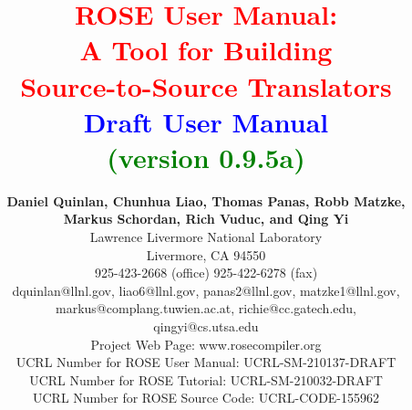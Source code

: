 \documentclass[10pt]{book}
\begin{document}
\title{ {\bf \textcolor{red}{         ROSE User Manual: \\ 
                                     A Tool for Building \\
                                Source-to-Source Translators} \\
                             \textcolor{blue}{Draft User Manual} \\
                               \textcolor{green}{(version 0.9.5a)} } }

\author{ {\bf Daniel Quinlan, Chunhua Liao, Thomas Panas, Robb Matzke,} \\
         {\bf Markus Schordan, Rich Vuduc, and Qing Yi} \\
         Lawrence Livermore National Laboratory \\ 
         Livermore, CA  94550 \\
         925-423-2668 (office)  925-422-6278 (fax) \\
         dquinlan@llnl.gov, liao6@llnl.gov, panas2@llnl.gov, matzke1@llnl.gov, \\ 
         markus@complang.tuwien.ac.at, richie@cc.gatech.edu, \\
         qingyi@cs.utsa.edu \\
         Project Web Page: www.rosecompiler.org \\
         UCRL Number for ROSE User Manual: UCRL-SM-210137-DRAFT \\
         UCRL Number for ROSE Tutorial: UCRL-SM-210032-DRAFT \\
         UCRL Number for ROSE Source Code: UCRL-CODE-155962 \\
          \\
}
\end{document}

